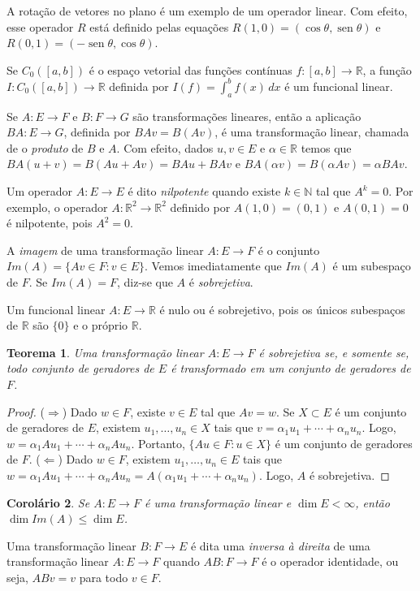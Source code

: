 \documentclass[12pt,a4paper]{article}
\newcommand{\N}{\mathbb{N}}
\newcommand{\R}{\mathbb{R}}
\newtheorem{thm}{Teorema}[section]
\newtheorem{cor}[thm]{Corolário}
\theoremstyle{definition}
\DeclareMathOperator{\sen}{sen}
\begin{document}
A rotação de vetores no plano é um exemplo de um operador linear. Com
efeito, esse operador $R$ está definido pelas equações
$R(1,0)=(\cos\theta,\sen\theta)$ e $R(0,1)=(-\sen\theta,\cos\theta)$.

Se $C_0([a,b])$ é o espaço vetorial das funções contínuas
$f:[a,b]\to\R$, a função $I:C_0([a,b])\to\R$ definida por
$I(f)=\int_a^bf(x)\,dx$ é um funcional linear.

Se $A:E\to F$ e $B:F\to G$ são transformações lineares, então a
aplicação $BA:E\to G$, definida por $BAv=B(Av)$, é uma transformação
linear, chamada de o \textit{produto} de $B$ e $A$. Com efeito, dados
$u,v\in E$ e $\alpha\in\R$ temos que $BA(u+v)=B(Au+Av)=BAu+BAv$ e
$BA(\alpha v)=B(\alpha Av)=\alpha BAv$.

Um operador $A:E\to E$ é dito \textit{nilpotente} quando existe
$k\in\N$ tal que $A^k=0$. Por exemplo, o operador $A:\R^2\to\R^2$
definido por $A(1,0)=(0,1)$ e $A(0,1)=0$ é nilpotente, pois $A^2=0$.

A \textit{imagem} de uma transformação linear $A:E\to F$ é o conjunto
$Im(A)=\{Av\in F:v\in E\}$. Vemos imediatamente que $Im(A)$ é um
subespaço de $F$. Se $Im(A)=F$, diz-se que $A$ é \textit{sobrejetiva}.

Um funcional linear $A:E\to \R$ é nulo ou é sobrejetivo, pois os
únicos subespaços de $\R$ são $\{0\}$ e o próprio $\R$.
 
\begin{thm}
  \label{thm:5}
  Uma transformação linear $A:E\to F$ é sobrejetiva se, e somente se,
  todo conjunto de geradores de $E$ é transformado em um conjunto de
  geradores de $F$.
\end{thm}
\begin{proof}
  ($\Rightarrow$) Dado $w\in F$, existe $v\in E$ tal que $Av=w$. Se
  $X\subset E$ é um conjunto de geradores de $E$, existem
  $u_1,\ldots,u_n\in X$ tais que
  $v=\alpha_1u_1+\cdots+\alpha_nu_n$. Logo,
  $w=\alpha_1Au_1+\cdots+\alpha_nAu_n$. Portanto, $\{Au\in F:u\in X\}$
  é um conjunto de geradores de $F$. ($\Leftarrow$) Dado $w\in F$,
  existem $u_1,\ldots,u_n\in E$ tais que
  $w=\alpha_1Au_1+\cdots+\alpha_nAu_n=A(\alpha_1u_1+\cdots+\alpha_nu_n)$. Logo,
  $A$ é sobrejetiva.
\end{proof}
\begin{cor}
  \label{thm:6}
  Se $A:E\to F$ é uma transformação linear e $\dim E<\infty$, então
  $\dim Im(A)\le \dim E$.
\end{cor}

Uma transformação linear $B:F\to E$ é dita uma \textit{inversa à
  direita} de uma transformação linear $A:E\to F$ quando $AB:F\to F$ é
o operador identidade, ou seja, $ABv=v$ para todo $v\in F$.
\end{document}
